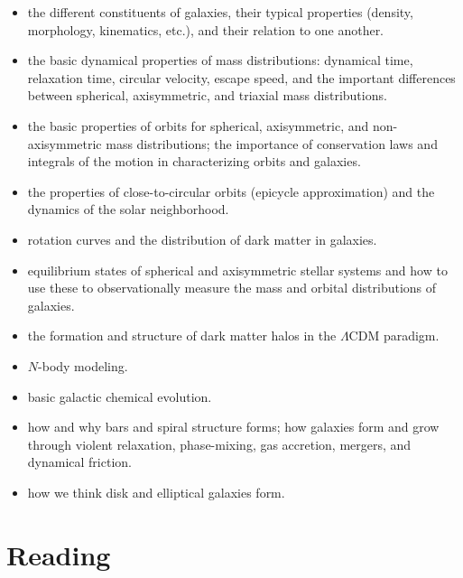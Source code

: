 \documentclass{article}
\begin{document}
\begin{itemize}

  \item the different constituents of galaxies, their typical
    properties (density, morphology, kinematics, etc.), and their
    relation to one another.

  \item the basic dynamical properties of mass distributions:
    dynamical time, relaxation time, circular velocity, escape speed,
    and the important differences between spherical, axisymmetric, and
    triaxial mass distributions.

  \item the basic properties of orbits for spherical, axisymmetric,
    and non-axisymmetric mass distributions; the importance of
    conservation laws and integrals of the motion in characterizing
    orbits and galaxies.

  \item the properties of close-to-circular orbits (epicycle
    approximation) and the dynamics of the solar neighborhood.

  \item rotation curves and the distribution of dark matter in
    galaxies.

  \item equilibrium states of spherical and axisymmetric stellar
    systems and how to use these to observationally measure the mass and
    orbital distributions of galaxies.

  \item the formation and structure of dark matter halos in the
    $\Lambda$CDM paradigm.

  \item $N$-body modeling.

  \item basic galactic chemical evolution.

  \item how and why bars and spiral structure forms; how galaxies form
    and grow through violent relaxation, phase-mixing, gas accretion,
    mergers, and dynamical friction.

  \item how we think disk and elliptical galaxies form.

\end{itemize}

\section*{Reading}
\end{document}
